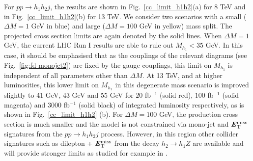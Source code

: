 For $pp\rightarrow h_1h_2 j$, the results are shown in Fig.~\ref{cc_limit_h1h2}(a) for 8 TeV and in Fig.~\ref{cc_limit_h1h2}(b) for 13 TeV. We consider two scenarios with a small ($\Delta M =1$ GeV in blue) and large ($\Delta M =100$ GeV in yellow) mass split. The projected cross section limits are again denoted by the solid lines. When $\Delta M = 1$ GeV, the current LHC Run I results are able to rule out $M_{h_1} < 35$ GeV. In this case, it should be emphasised that as the couplings of the relevant diagrams (see Fig.~\ref{fig:fd-monojet2}) are fixed by the gauge couplings, this limit on $M_{h_1}$ is independent of all parameters other than $\Delta M$. At 13 TeV, and at higher luminosities, this lower limit on $M_{h_1}$ in this degenerate mass scenario is improved slightly to 41 GeV, 43 GeV and 55 GeV for $20$ fb$^{-1}$ (solid red), $100$ fb$^{-1}$ (solid magenta) and $3000$ fb$^{-1}$ (solid black) of integrated luminosity respectively, as is shown in Fig.~\ref{cc_limit_h1h2} (b). For $\Delta M = 100$ GeV, the production cross section is much smaller and the model is not constrained via mono-jet and $\textbf{\textit{E}$_{\rm T}^{\rm miss}$}{}$ signatures from the $pp\rightarrow h_1h_2 j$ process. However, in this region other collider signatures such as dilepton + $\textbf{\textit{E}$_{\rm T}^{\rm miss}$}{}$ from the decay $h_2 \to h_1Z$ are available and will provide stronger limits as studied for example in \cite{Belanger:2015kga}.






